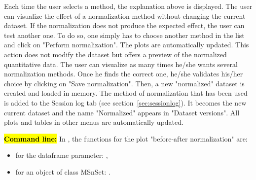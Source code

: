 \documentclass[12pt]{article}
\begin{document}
{\begin {description}
\end {description}

Each time the user selects a method, the explanation above is displayed. The 
user can visualize the effect of a normalization method without changing the 
current dataset. If the normalization does not produce the expected effect, 
the user can test another one. To do so, one simply has to choose another 
method in the list and click on "Perform normalization". The plots are 
automatically updated. This action does not modify the dataset but offers a 
preview of the normalized quantitative data.
The user can visualize as many times he/she wants several normalization 
methods. Once he finds the correct one, he/she validates his/her choice by 
clicking on "Save normalization". Then, a new "normalized" dataset is created 
and loaded in memory. The method of normalization that has been used is 
added to the Session log tab (see section~\ref{sec:sessionlog}). It becomes 
the new current dataset and the name "Normalized" appears in "Dataset 
versions". All plots and tables in other menus are automatically updated.

{\hl{\bf Command line:} In , the functions for the plot 
"before-after normalization" are:
\begin{itemize}
\item for the dataframe parameter:  ,
\item for an object of class MSnSet: 
 .
\end{itemize}}


}
\end{document}
